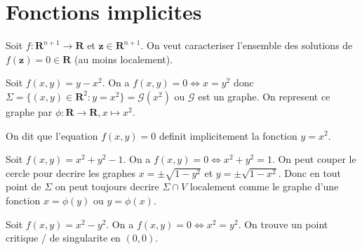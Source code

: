 
\section{Fonctions implicites}
Soit $f:\mathbf{R}^{n+1}\to \mathbf{R}$ et $\boldsymbol{z}\in \mathbf{R}^{n+1}$. On veut caracteriser l'ensemble des solutions de $f(\boldsymbol{z})=0\in \mathbf{R}$ (au moins localement).
\begin{example}
Soit $f(x,y)=y-x^{2}$. On a $f(x,y)=0\Leftrightarrow x=y^{2}$ donc $\Sigma=\{ (x,y)\in \mathbf{R}^{2}:y=x^{2} \}=\mathcal{G}(x^{2})$ ou $\mathcal{G}$ est un graphe. On represent ce graphe par $\phi:\mathbf{R}\to \mathbf{R},x\mapsto x^{2}$.

On dit que l'equation $f(x,y)=0$ definit implicitement la fonction $y=x^{2}$.
\end{example}
\begin{example}
Soit $f(x,y)=x^{2}+y^{2}-1$. On a $f(x,y)=0\Leftrightarrow x^{2}+y^{2}=1$. On peut couper le cercle pour decrire les graphes $x=\pm\sqrt{ 1-y^{2} }$ et $y=\pm \sqrt{ 1-x^{2} }$. Donc en tout point de $\Sigma$ on peut toujours decrire $\Sigma \cap V$ localement comme le graphe d'une fonction $x=\phi(y)$ ou $y=\phi(x)$.
\end{example}
\begin{example}
Soit $f(x,y)=x^{2}-y^{2}$. On a $f(x,y)=0 \Leftrightarrow x^{2}=y^{2}$. On trouve un point critique / de singularite en $(0,0)$.
\end{example}

